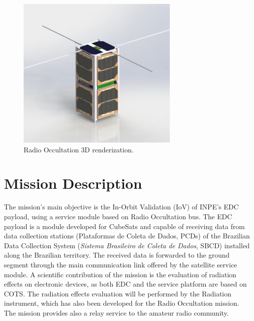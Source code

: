 \begin{figure}[!ht]
    \begin{center}
        \includegraphics[width=0.7\textwidth]{figures/floripasat-2.jpg}
        \caption{Radio Occultation 3D renderization.}
        \label{fig:Radio Occultation-render}
    \end{center}
\end{figure}

\section{Mission Description}
The mission's main objective is the In-Orbit Validation (IoV) of INPE's EDC payload, using a service module based on Radio Occultation bus. The EDC payload is a module developed for CubeSats and capable of receiving data from data collection stations (Plataformas de Coleta de Dados, PCDs) of the Brazilian Data Collection System (\textit{Sistema Brasileiro de Coleta de Dados}, SBCD) installed along the Brazilian territory. The received data is forwarded to the ground segment through the main communication link offered by the satellite service module. A scientific contribution of the mission is the evaluation of radiation effects on electronic devices, as both EDC and the service platform are based on COTS. The radiation effects evaluation will be performed by the Radiation instrument, which has also been developed for the Radio Occultation mission. The mission provides also a relay service to the amateur radio community.


